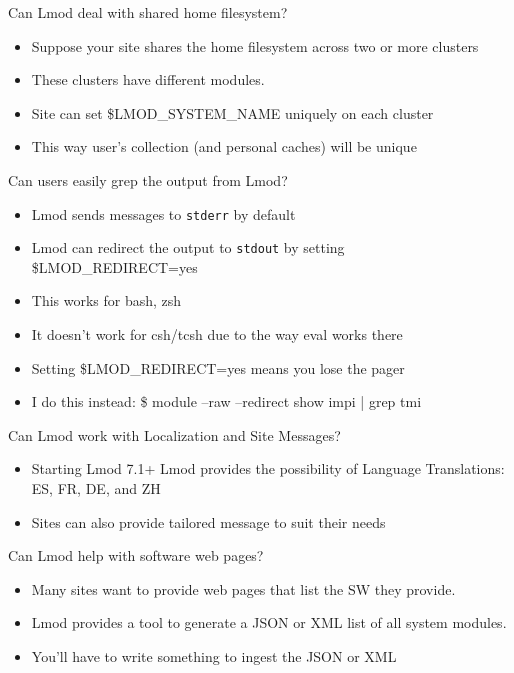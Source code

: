 \documentclass{beamer}
\begin{document}
\begin{frame}{Can Lmod deal with shared home filesystem?}
  \begin{itemize}
    \item Suppose your site shares the home filesystem across two or
      more clusters
    \item These clusters have different modules.
    \item Site can set \$LMOD\_SYSTEM\_NAME uniquely on each cluster
    \item This way user's collection (and personal caches) will be
      unique
  \end{itemize}
\end{frame}

\begin{frame}{Can users easily grep the output from Lmod?}
  \begin{itemize}
    \item Lmod sends messages to \texttt{stderr} by default
    \item Lmod can redirect the output to \texttt{stdout} by setting
      \$LMOD\_REDIRECT=yes
    \item This works for bash, zsh
    \item It doesn't work for csh/tcsh due to the way eval works there
    \item Setting \$LMOD\_REDIRECT=yes means you lose the pager
    \item I do this instead: \$ module --raw --redirect show impi |
      grep tmi
  \end{itemize}
\end{frame}

\begin{frame}{Can Lmod work with Localization and Site Messages?}
  \begin{itemize}
    \item Starting Lmod 7.1+ Lmod provides the possibility of Language
      Translations: ES, FR, DE, and ZH
    \item Sites can also provide tailored message to suit their needs
  \end{itemize}
\end{frame}

\begin{frame}{Can Lmod help with software web pages?}
  \begin{itemize}
    \item Many sites want to provide web pages that list the SW
      they provide.
    \item Lmod provides a tool to generate a JSON or XML list of all
      system modules.
    \item You'll have to write something to ingest the JSON or XML
  \end{itemize}
\end{frame}
\end{document}
